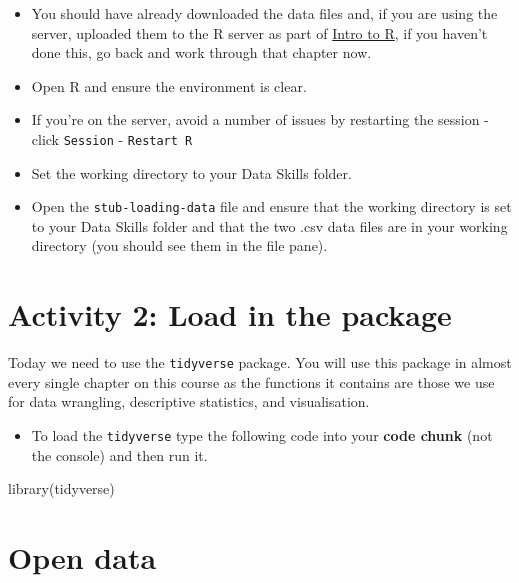 \documentclass[
  oneside]{book}
\newenvironment{Shaded}{\begin{snugshade}}{\end{snugshade}}
\newcommand{\FunctionTok}[1]{\textcolor[rgb]{0.00,0.00,0.00}{#1}}
\newcommand{\NormalTok}[1]{#1}
\providecommand{\tightlist}{%
  \setlength{\itemsep}{0pt}\setlength{\parskip}{0pt}}
\begin{document}
\begin{itemize}
\tightlist
\item
  You should have already downloaded the data files and, if you are using the server, uploaded them to the R server as part of \href{https://psyteachr.github.io/ug1-practical/ref1.html}{Intro to R}, if you haven't done this, go back and work through that chapter now.
\item
  Open R and ensure the environment is clear.
\item
  If you're on the server, avoid a number of issues by restarting the session - click \texttt{Session} - \texttt{Restart\ R}\\
\item
  Set the working directory to your Data Skills folder.\\
\item
  Open the \texttt{stub-loading-data} file and ensure that the working directory is set to your Data Skills folder and that the two .csv data files are in your working directory (you should see them in the file pane).
\end{itemize}

\hypertarget{activity-2-load-in-the-package}{%
\section{Activity 2: Load in the package}\label{activity-2-load-in-the-package}}

Today we need to use the \texttt{tidyverse} package. You will use this package in almost every single chapter on this course as the functions it contains are those we use for data wrangling, descriptive statistics, and visualisation.

\begin{itemize}
\tightlist
\item
  To load the \texttt{tidyverse} type the following code into your \textbf{code chunk} (not the console) and then run it.
\end{itemize}

\begin{Shaded}
\begin{Highlighting}[]
\FunctionTok{library}\NormalTok{(tidyverse)}
\end{Highlighting}
\end{Shaded}

\hypertarget{open-data}{%
\section{Open data}\label{open-data}}
\end{document}
